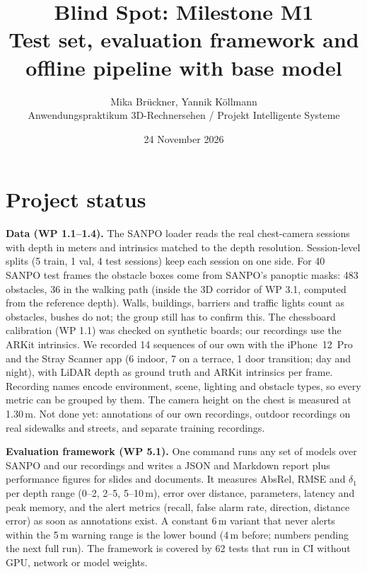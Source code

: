 \documentclass[11pt,a4paper]{article}
\title{\vspace{-1.5em}Blind Spot: Milestone M1\\[0.2em]
  \large Test set, evaluation framework and offline pipeline with base model}
\author{Mika Brückner, Yannik Köllmann\\[0.2em]
  \small Anwendungspraktikum 3D-Rechnersehen / Projekt \glqq Intelligente Systeme\grqq}
\date{24 November 2026}
\begin{document}
\maketitle
\vspace{-1.5em}

\section*{Project status}

\textbf{Data (WP 1.1--1.4).} The SANPO loader reads the real chest-camera sessions with depth in meters and
intrinsics matched to the depth resolution. Session-level splits (5 train, 1 val, 4 test sessions) keep each session on one side. For 40 SANPO
test frames the obstacle boxes come from SANPO's panoptic masks: 483 obstacles, 36 in the walking path
(inside the 3D corridor of WP 3.1, computed from the reference depth). Walls, buildings, barriers and traffic lights count as obstacles, bushes do not; the
group still has to confirm this. The chessboard calibration (WP 1.1) was checked on synthetic boards; our
recordings use the ARKit intrinsics. We recorded
14 sequences of our own with the iPhone~12~Pro and the Stray Scanner app (6 indoor, 7 on a terrace, 1 door
transition; day and night), with LiDAR depth as ground truth and ARKit intrinsics per frame. Recording names encode
environment, scene, lighting and obstacle types, so every metric can be grouped by them. The camera height on the chest is measured at 1.30\,m. Not done yet: annotations of our own
recordings, outdoor recordings on real sidewalks and streets, and separate training recordings.

\textbf{Evaluation framework (WP 5.1).} One command runs any set of models over SANPO and our recordings and
writes a JSON and Markdown report plus performance figures for slides and documents. It measures AbsRel, RMSE and $\delta_1$ per
depth range (0--2, 2--5, 5--10\,m), error over distance, parameters, latency and peak memory, and the alert
metrics (recall, false alarm rate, direction, distance error) as soon as annotations exist. A constant 6\,m variant that never alerts within the 5\,m warning range is the lower bound (4\,m before; numbers pending the next full run).
The framework is covered by 62 tests that run in CI without GPU, network or model weights.
\end{document}
